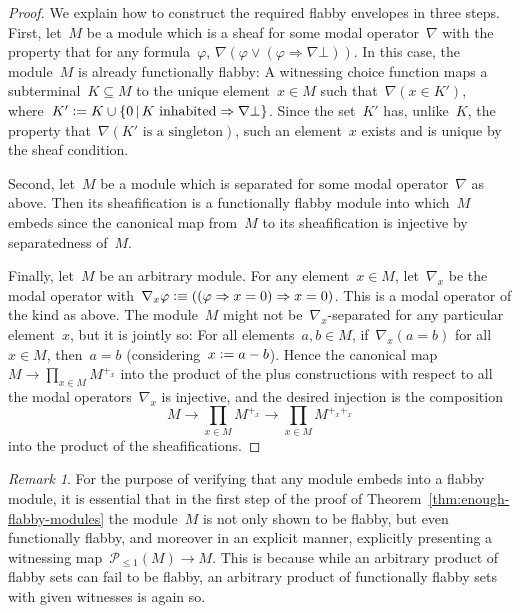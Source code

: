 \documentclass[oneside]{amsart}
\theoremstyle{definition}
\theoremstyle{plain}
\theoremstyle{remark}
\newtheorem{rem}[defn]{Remark}
\renewcommand{\P}{\mathcal{P}}
\newcommand{\defeq}{\vcentcolon=}
\newcommand{\defeqv}{\vcentcolon\equiv}
\renewcommand{\_}{\mathpunct{.}\,}
\begin{document}
\begin{proof}We explain how to construct the required flabby envelopes
in three steps.
First, let~$M$ be a module which is a sheaf for some modal operator~$\nabla$
with the property that for any
formula~$\varphi$, $\nabla(\varphi \vee (\varphi \Rightarrow \nabla\bot))$. In
this case, the module~$M$ is already functionally flabby: A witnessing choice
function maps a subterminal~$K \subseteq M$ to the unique element~$x \in M$
such that~$\nabla(x \in K')$, where~$K' \defeq K \cup \{ 0 \,|\, \text{$K$
inhabited} \Rightarrow \nabla\bot \}$. Since the set~$K'$ has, unlike~$K$, the property
that~$\nabla(\text{$K'$ is a singleton})$, such an element~$x$ exists and is unique
by the sheaf condition.

Second, let~$M$ be a module which is separated for some modal operator~$\nabla$
as above. Then its sheafification is a functionally flabby module into
which~$M$ embeds since the canonical map from~$M$ to its sheafification is
injective by separatedness of~$M$.

Finally, let~$M$ be an arbitrary module. For any element~$x \in M$,
let~$\nabla_x$ be the modal operator with~$\nabla_x\varphi \defeqv ((\varphi \Rightarrow x
= 0) \Rightarrow x = 0)$. This is a modal operator of the kind as above.
The module~$M$ might not be~$\nabla_x$-separated for
any particular element~$x$, but it is jointly so: For all elements~$a,b\in M$,
if~$\nabla_x(a = b)$ for all~$x \in M$, then~$a = b$ (considering~$x \defeq
a-b$). Hence the canonical map~$M \to \prod_{x \in M} M^{+_x}$ into the product
of the plus constructions with respect to all the modal operators~$\nabla_x$ is
injective, and the desired injection is the composition
\[ M \longrightarrow \prod_{x \in M} M^{+_x} \longrightarrow \prod_{x \in M}
M^{+_x+_x} \]
into the product of the sheafifications.
\end{proof}

\begin{rem}For the purpose of verifying that any module embeds into a flabby
module, it is essential that in the first step of the proof of
Theorem~\ref{thm:enough-flabby-modules} the module~$M$ is not only shown to be flabby,
but even functionally flabby, and moreover in an explicit manner, explicitly
presenting a witnessing map~$\P_{\leq1}(M) \to M$. This is because while an
arbitrary product of flabby sets can fail to be flabby, an arbitrary product of
functionally flabby sets with given witnesses is again so.
\end{rem}
\end{document}
